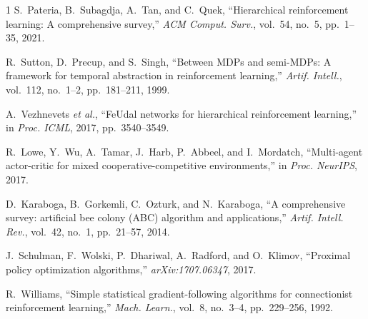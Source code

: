 \documentclass[conference]{IEEEtran}
\begin{document}
\begin{thebibliography}{1}
S.~Pateria, B.~Subagdja, A.~Tan, and C.~Quek, ``Hierarchical reinforcement learning: A comprehensive survey,'' \textit{ACM Comput. Surv.}, vol.~54, no.~5, pp.~1--35, 2021.

R.~Sutton, D.~Precup, and S.~Singh, ``Between MDPs and semi-MDPs: A framework for temporal abstraction in reinforcement learning,'' \textit{Artif. Intell.}, vol.~112, no.~1--2, pp.~181--211, 1999.

A.~Vezhnevets \textit{et al.}, ``FeUdal networks for hierarchical reinforcement learning,'' in \textit{Proc. ICML}, 2017, pp.~3540--3549.

R.~Lowe, Y.~Wu, A.~Tamar, J.~Harb, P.~Abbeel, and I.~Mordatch, ``Multi-agent actor-critic for mixed cooperative-competitive environments,'' in \textit{Proc. NeurIPS}, 2017.

D.~Karaboga, B.~Gorkemli, C.~Ozturk, and N.~Karaboga, ``A comprehensive survey: artificial bee colony (ABC) algorithm and applications,'' \textit{Artif. Intell. Rev.}, vol.~42, no.~1, pp.~21--57, 2014.

J.~Schulman, F.~Wolski, P.~Dhariwal, A.~Radford, and O.~Klimov, ``Proximal policy optimization algorithms,'' \textit{arXiv:1707.06347}, 2017.

R.~Williams, ``Simple statistical gradient-following algorithms for connectionist reinforcement learning,'' \textit{Mach. Learn.}, vol.~8, no.~3--4, pp.~229--256, 1992.

\end{thebibliography}
\end{document}
